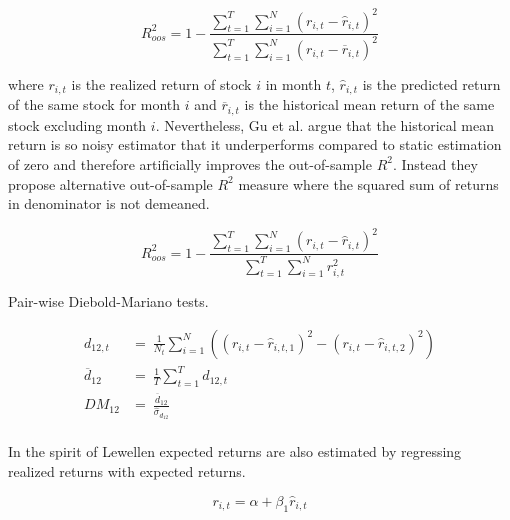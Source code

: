 \documentclass{article}
\begin{document}
\begin{equation}
\label{eq:r2Trad}
R^{2}_{oos} = 1 - \frac{\sum^T_{t=1} \sum^N_{i=1} (r_{i, t} - \hat r_{i, t})^2}{ \sum^T_{t=1} \sum^N_{i=1} (r_{i, t} - \overline{r}_{i, t} )^2}
\end{equation}

where $r_{i, t}$ is the realized return of stock $i$ in month $t$, $\hat r_{i, t}$ is the predicted return of the same stock for month $i$ and $\overline{r}_{i, t}$ is the historical mean return of the same stock excluding month $i$. Nevertheless, Gu et al. \citeyear{guetal} argue that the historical mean return is so noisy estimator that it underperforms compared to static estimation of zero and therefore artificially improves the out-of-sample $R^{2}$. Instead they propose alternative out-of-sample $R^{2}$ measure where the squared sum of returns in denominator is not demeaned. 

\begin{equation}
\label{eq:r2}
R^{2}_{oos} = 1 - \frac{\sum^T_{t=1} \sum^N_{i=1} (r_{i, t} - \hat r_{i, t})^2}{ \sum^T_{t=1} \sum^N_{i=1} r^2_{i, t}}
\end{equation}

Pair-wise Diebold-Mariano tests.

\begin{equation}
\label{eq:Diebold-Mariano}
\begin{split}
 d_{12, t} 			& = \ \frac{1}{N_{t}}  \sum^N_{i=1}((r_{i, t} - \hat r_{i, t, 1})^2 - (r_{i, t} - \hat r_{i, t, 2})^2) \\
\overline{d}_{12} 	& = \ \frac{1}{T} \sum^T_{t=1} d_{12, t} \\
DM_{12} 			& = \ \frac{\overline{d}_{12}}{\hat \sigma_{d_{12}}} \\
\end{split}
\end{equation}

In the spirit of Lewellen \citeyear{lewellen2015} expected returns are also estimated by regressing realized returns with expected returns. 

\begin{equation}
\label{eq:realizedRegression}
r_{i, t} = \alpha + \beta_1 \hat r_{i, t}
\end{equation}
\end{document}
